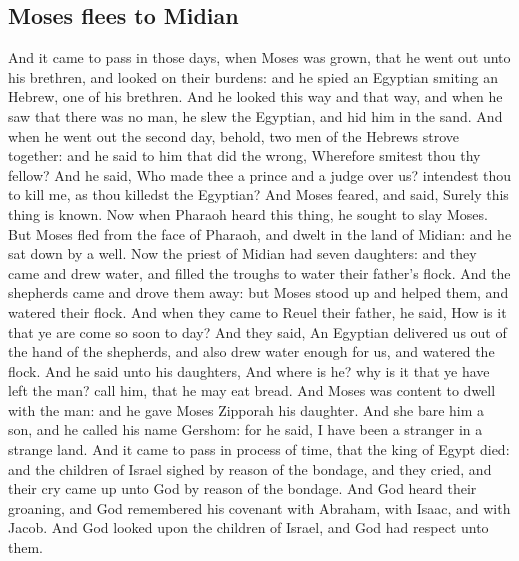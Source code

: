 \begin{biblechapter}
\section*{Moses flees to Midian}
\verse And it came to pass in those days, when Moses was grown, that he went out unto his brethren, and looked on their burdens: and he spied an Egyptian smiting an Hebrew, one of his brethren.
\verse And he looked this way and that way, and when he saw that there was no man, he slew the Egyptian, and hid him in the sand.
\verse And when he went out the second day, behold, two men of the Hebrews strove together: and he said to him that did the wrong, Wherefore smitest thou thy fellow?
\verse And he said, Who made thee a prince and a judge over us? intendest thou to kill me, as thou killedst the Egyptian? And Moses feared, and said, Surely this thing is known.
\verse Now when Pharaoh heard this thing, he sought to slay Moses. But Moses fled from the face of Pharaoh, and dwelt in the land of Midian: and he sat down by a well.
\verse Now the priest of Midian had seven daughters: and they came and drew water, and filled the troughs to water their father's flock.
\verse And the shepherds came and drove them away: but Moses stood up and helped them, and watered their flock.
\verse And when they came to Reuel their father, he said, How is it that ye are come so soon to day?
\verse And they said, An Egyptian delivered us out of the hand of the shepherds, and also drew water enough for us, and watered the flock.
\verse And he said unto his daughters, And where is he? why is it that ye have left the man? call him, that he may eat bread.
\verse And Moses was content to dwell with the man: and he gave Moses Zipporah his daughter.
\verse And she bare him a son, and he called his name Gershom: for he said, I have been a stranger in a strange land.
\verse And it came to pass in process of time, that the king of Egypt died: and the children of Israel sighed by reason of the bondage, and they cried, and their cry came up unto God by reason of the bondage.
\verse And God heard their groaning, and God remembered his covenant with Abraham, with Isaac, and with Jacob.
\verse And God looked upon the children of Israel, and God had respect unto them.
\end{biblechapter}

\columnbreak %

